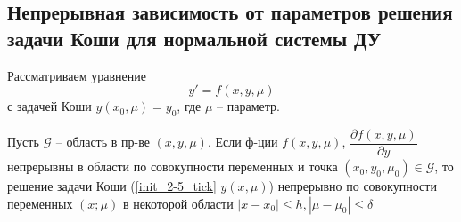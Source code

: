 \subsection{Непрерывная зависимость от параметров решения задачи Коши для нормальной системы ДУ}
	Рассматриваем уравнение
	\begin{equation}\label{init_2-5_tick}
	y' = f(x, y, \mu)
	\end{equation}
	с задачей Коши $y(x_0, \mu) = y_0$, где $\mu$ -- параметр.
\begin{theorem}
	Пусть $\mathcal{G}$ -- область в пр-ве $(x, y, \mu)$. Если ф-ции $f(x, y, \mu)$, $\dfrac{\partial f(x, y, \mu)}{\partial y}$ непрерывны в области по совокупности переменных и точка $(x_0, y_0, \mu_0) \in \mathcal{G}$, то решение задачи Коши (\ref{init_2-5_tick} $y(x, \mu)$) непрерывно по совокупности переменных $(x; \mu)$ в некоторой области $|x - x_0| \leq h, |\mu - \mu_0| \leq \delta$
\end{theorem}
